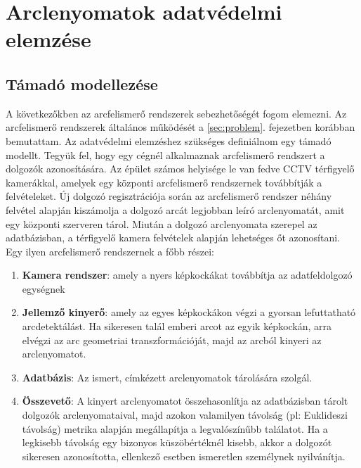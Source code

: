 \section{Arclenyomatok adatvédelmi elemzése}
\label{sec:4}

\subsection{Támadó modellezése} %
\label{sec:tamado}

A következőkben az arcfelismerő rendszerek sebezhetőségét fogom elemezni. Az arcfelismerő rendszerek általános működését a \ref{sec:problem}. fejezetben korábban bemutattam. Az adatvédelmi elemzéshez szükséges definiálnom egy támadó modellt. Tegyük fel, hogy egy cégnél alkalmaznak arcfelismerő rendszert a dolgozók azonosítására. Az épület számos helyisége le van fedve CCTV térfigyelő kamerákkal, amelyek egy központi arcfelismerő rendszernek továbbítják a felvételeket. Új dolgozó regisztrációja során az arcfelismerő rendszer néhány felvétel alapján kiszámolja a dolgozó arcát legjobban leíró arclenyomatát, amit egy központi szerveren tárol. Miután a dolgozó arclenyomata szerepel az adatbázisban, a térfigyelő kamera felvételek alapján lehetséges őt azonosítani. Egy ilyen arcfelismerő rendszernek a főbb részei: 

\begin{enumerate}
	\item \textbf{Kamera rendszer}: amely a nyers képkockákat továbbítja az adatfeldolgozó egységnek
	\item \textbf{Jellemző kinyerő}: amely az egyes képkockákon végzi a gyorsan lefuttatható arcdetektálást. Ha sikeresen talál emberi arcot az egyik képkockán, arra elvégzi az arc geometriai transzformációját, majd az arcból kinyeri az arclenyomatot.
	\item \textbf{Adatbázis}: Az ismert, címkézett arclenyomatok tárolására szolgál.
	\item \textbf{Összevető}: A kinyert arclenyomatot összehasonlítja az adatbázisban tárolt dolgozók arclenyomataival, majd azokon valamilyen távolság (pl: Euklideszi távolság) metrika alapján megállapítja a legvalószínűbb találatot. Ha a legkisebb távolság egy bizonyos küszöbértéknél kisebb, akkor a dolgozót sikeresen azonosította, ellenkező esetben ismeretlen személynek nyilvánítja.
\end{enumerate}

